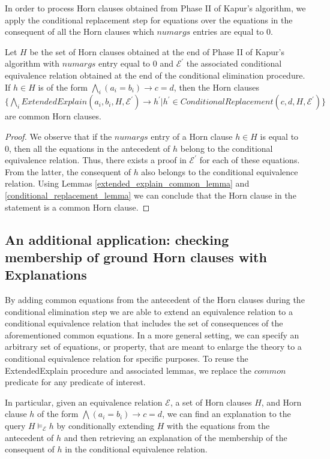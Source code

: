 In order to process Horn clauses obtained 
from Phase II of Kapur's algorithm, we apply 
the conditional replacement step for equations
over the equations in the consequent of all 
the Horn clauses which $numargs$ entries are 
equal to 0.

\begin{lemma}
  Let $H$ be the set of Horn clauses
  obtained at the end of Phase II of Kapur's 
  algorithm with $numargs$ entry equal to 0 
  and $\mathcal{E^{'}}$ the associated
  conditional equivalence relation obtained 
  at the end of the conditional elimination 
  procedure. 
  If $h \in H$ is of the form $\bigwedge_i (a_i = b_i) 
  \rightarrow c = d$, then the Horn clauses
  $\{\bigwedge_i ExtendedExplain(a_i, b_i, H, \mathcal{E^{'}})
    \rightarrow h^{'}  | 
    h^{'} \in 
  ConditionalReplacement(c, d, H, \mathcal{E^{'}})\}$
  are common Horn clauses.
\end{lemma}

\begin{proof}
  We observe that if the $numargs$ entry of a Horn clause
  $h \in H$ is equal to 0, then 
  all the equations in the antecedent of $h$ belong 
  to the conditional equivalence relation. Thus, 
  there exists a proof in $\mathcal{E^{'}}$ for
  each of these equations. From the latter, the consequent
  of $h$ also belongs to the conditional equivalence
  relation. Using Lemmas \ref{extended_explain_common_lemma}
  and \ref{conditional_replacement_lemma} we can conclude that
  the Horn clause in the statement is a common Horn clause.
\end{proof}

\subsection{An additional application: checking
  membership of ground Horn clauses 
with Explanations}

By adding common equations
from the antecedent of the Horn clauses during the 
conditional elimination step we are able to 
extend an equivalence relation to a conditional
equivalence relation that includes the set 
of consequences of the aforementioned common equations.
In a more general setting, we can specify an arbitrary
set of equations, or property, 
that are meant to enlarge the theory
to a conditional equivalence relation for 
specific purposes. To reuse the ExtendedExplain
procedure and associated lemmas, we replace the $common$
predicate for any predicate of interest.

In particular, given an equivalence relation $\mathcal{E}$, a 
set of Horn clauses $H$, and Horn clause $h$ of the form 
$\bigwedge (a_i = b_i) \rightarrow c = d$, we can 
find an explanation to the query $H \models_{\mathcal{E}} h$
by conditionally extending $H$ with the equations
from the antecedent of $h$ and then retrieving an explanation
of the membership of the consequent of $h$ in the conditional 
equivalence relation.

